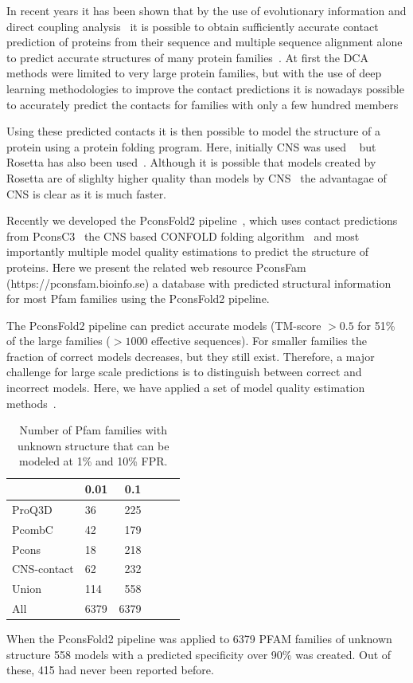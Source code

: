 \documentclass[a4,center,fleqn]{NAR}
\begin{document}
In recent years it has been shown that by the use of evolutionary
information and direct coupling analysis~\cite{Weigt19116270} it is
possible to obtain sufficiently accurate contact prediction of
proteins from their sequence and multiple sequence alignment alone to
predict accurate structures of many protein
families~\cite{Sulkowska2012}. At first the DCA methods were limited
to very large protein families, but with the use of deep learning
methodologies to improve the contact predictions it is nowadays
possible to accurately predict the contacts for families with only a
few hundred members~\cite{Skwark25375897,Michel28535189,Wang28056090}

Using these predicted contacts it is then possible to model the
structure of a protein using a protein folding program. Here,
initially CNS was used ~\cite{Morcos22106262} but Rosetta has also
been used~\cite{Baker:1999}. Although it is possible that models
created by Rosetta are of slighlty higher quality than models by
CNS~\cite{Michel25161237} the advantagae of CNS is clear as it is much
faster. 

Recently we developed the PconsFold2 pipeline~\cite{Michel28881974}, which uses contact
predictions from PconsC3~\cite{Michel28535189} the CNS based CONFOLD folding
algorithm~\cite{Adhikari25974172} and most importantly multiple model quality estimations
\cite{Uziela28052925,Lundstrom:2001} to predict the structure of
proteins. Here we present the related web resource PconsFam
(https://pconsfam.bioinfo.se) a database with predicted structural
information for most Pfam families using the PconsFold2
pipeline.

The PconsFold2 pipeline can predict accurate models (TM-score $>0.5$
for 51\% of the large families ($>1000$ effective sequences). For
smaller families the fraction of correct models decreases, but they
still exist. Therefore, a major challenge for large scale predictions
is to distinguish between correct and incorrect models. Here, we have
applied a set of model quality estimation methods~\cite{Kryshtafovych28833563}.

\begin{table}[]
\centering
\caption{Number of Pfam families with unknown structure that can be modeled at
1\% and 10\% FPR.}
\label{tab:nopdb1}
    \begin{tabular}{lp{2cm}rp{2cm}rp{2cm}}
  \hline
 & 0.01 & 0.1 \\ 
  \hline
  ProQ3D & 36 & 225 \\ 
  PcombC & 42 & 179 \\ 
  Pcons & 18 & 218 \\ 
  CNS-contact & 62 & 232 \\  \hline 
  Union & 114 & 558 \\ 
  All & 6379 &  6379 \\ 
   \hline
\end{tabular}
\end{table}
When the PconsFold2 pipeline was applied to 6379 PFAM families of
unknown structure 558 models with a predicted specificity over 90\% was
created. Out of these, 415 had never been reported before.
\end{document}
